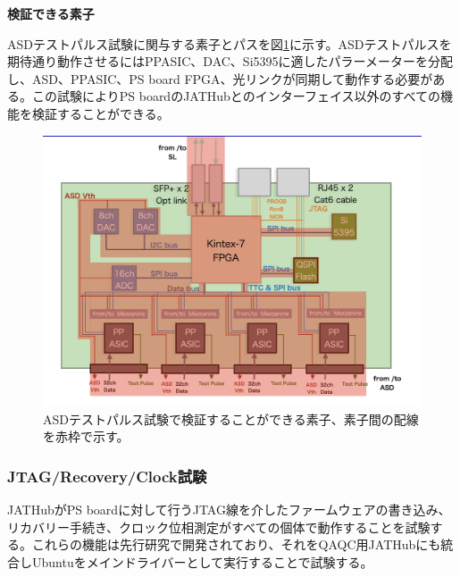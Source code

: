 \textbf{検証できる素子}\par
ASDテストパルス試験に関与する素子とパスを図\ref{QAQCasdtpelements}に示す。ASDテストパルスを期待通り動作させるにはPPASIC、DAC、Si5395に適したパラーメーターを分配し、ASD、PPASIC、PS board FPGA、光リンクが同期して動作する必要がある。この試験によりPS boardのJATHubとのインターフェイス以外のすべての機能を検証することができる。
\baselineskip

\begin{figure} 
\centering
\includegraphics[width=16cm]{fig/QAQC/QAQCasdtpelements.png}
\caption[ASDテストパルス試験で検証できる素子]{ASDテストパルス試験で検証することができる素子、素子間の配線を赤枠で示す。}
\label{QAQCasdtpelements}
\end{figure}

\subsubsection{JTAG/Recovery/Clock試験}
\label{subsubsec_jtag}
JATHubがPS boardに対して行うJTAG線を介したファームウェアの書き込み、リカバリー手続き、クロック位相測定がすべての個体で動作することを試験する。これらの機能は先行研究で開発されており、それをQAQC用JATHubにも統合しUbuntuをメインドライバーとして実行することで試験する。


